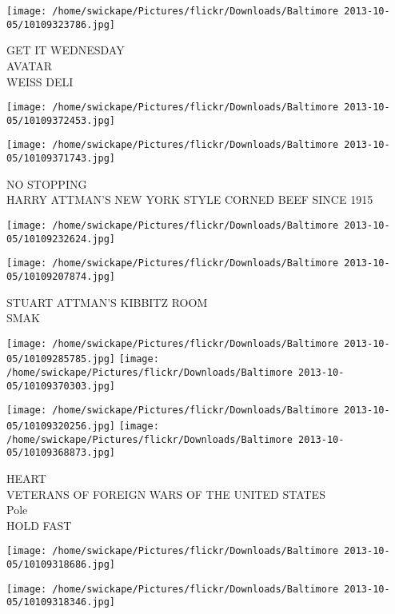 \documentclass[10pt,letterpaper]{article}
\begin{document}
\vspace{0.25in}
\texttt{[image: /home/swickape/Pictures/flickr/Downloads/Baltimore 2013-10-05/10109323786.jpg]}

GET IT WEDNESDAY\\
AVATAR\\
WEISS DELI\\
\pagebreak

\texttt{[image: /home/swickape/Pictures/flickr/Downloads/Baltimore 2013-10-05/10109372453.jpg]}

\vspace{0.25in}
\texttt{[image: /home/swickape/Pictures/flickr/Downloads/Baltimore 2013-10-05/10109371743.jpg]}

NO STOPPING\\
HARRY ATTMAN'S NEW YORK STYLE CORNED BEEF SINCE 1915\\
\pagebreak

\texttt{[image: /home/swickape/Pictures/flickr/Downloads/Baltimore 2013-10-05/10109232624.jpg]}

\vspace{0.25in}
\texttt{[image: /home/swickape/Pictures/flickr/Downloads/Baltimore 2013-10-05/10109207874.jpg]}

STUART ATTMAN'S KIBBITZ ROOM\\
SMAK\\
\pagebreak

\texttt{[image: /home/swickape/Pictures/flickr/Downloads/Baltimore 2013-10-05/10109285785.jpg]}
\texttt{[image: /home/swickape/Pictures/flickr/Downloads/Baltimore 2013-10-05/10109370303.jpg]}

\texttt{[image: /home/swickape/Pictures/flickr/Downloads/Baltimore 2013-10-05/10109320256.jpg]}
\texttt{[image: /home/swickape/Pictures/flickr/Downloads/Baltimore 2013-10-05/10109368873.jpg]}

HEART\\
VETERANS OF FOREIGN WARS OF THE UNITED STATES\\
Pole\\
HOLD FAST\\
\pagebreak

\texttt{[image: /home/swickape/Pictures/flickr/Downloads/Baltimore 2013-10-05/10109318686.jpg]}

\vspace{0.25in}
\texttt{[image: /home/swickape/Pictures/flickr/Downloads/Baltimore 2013-10-05/10109318346.jpg]}
\end{document}
